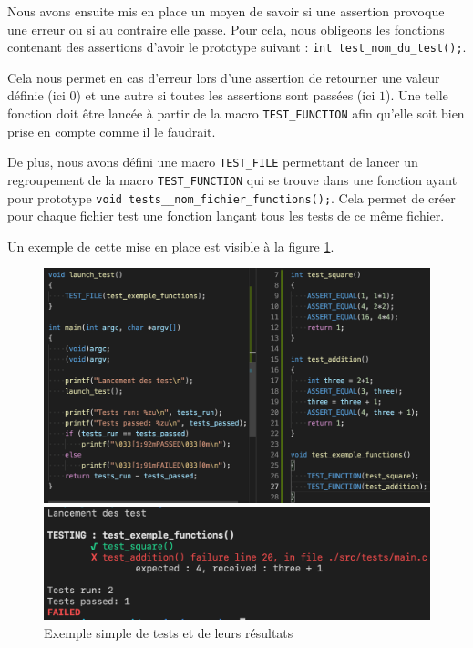 \documentclass[11pt]{article}
\begin{document}
Nous avons ensuite mis en place un moyen de savoir si une assertion provoque une erreur ou si au contraire elle passe. Pour cela, nous obligeons les fonctions contenant des assertions d'avoir le prototype suivant : \texttt{int test\_nom\_du\_test();}.

Cela nous permet en cas d'erreur lors d'une assertion de retourner une valeur définie (ici $0$) et une autre si toutes les assertions sont passées (ici $1$). Une telle fonction  doit être lancée à partir de la macro \texttt{TEST\_FUNCTION} afin qu'elle soit bien prise en compte comme il le faudrait.

De plus, nous avons défini une macro \texttt{TEST\_FILE} permettant de lancer un regroupement de la macro \texttt{TEST\_FUNCTION} qui se trouve dans une fonction ayant pour prototype \texttt{void tests\_\_nom\_fichier\_functions();}. Cela permet de créer pour chaque fichier test une fonction lançant tous les tests de ce même fichier.

Un exemple de cette mise en place est visible à la figure \ref{fig:tests-framework}.

\begin{figure}[H]
    \centering
    \begin{minipage}{0.55\linewidth}
        \centering
        \includegraphics[width=1\linewidth]{test-framework-code.png}
    \end{minipage}
    \hfill
    \begin{minipage}{0.44\linewidth}
        \centering
        \includegraphics[width=1\linewidth]{test-framework-result.png}
    \end{minipage}
        \caption{Exemple simple de tests et de leurs résultats}
    \label{fig:tests-framework}
\end{figure}
\end{document}
